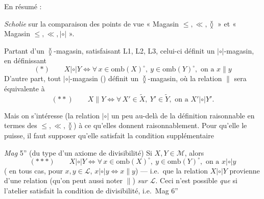 \documentclass[11pt,a4paper]{article}
\begin{document}
En résumé :

\emph{Scholie} sur la comparaison des points de vue « Magasin $\leq, \ll, \between$ » et « Magasin $\leq, \ll, \mathrel{|{\circ}|}$ ».

Partant d'un $\between$-magasin, satisfaisant L1, L2, L3, celui-ci définit un $\mathrel{|{\circ}|}$-magasin, en définissant
\[
  (*) \qquad X \mathrel{|{\circ}|} Y \Longleftrightarrow \forall\, x \in \mathrm{omb}(X)^{\circ},\ y \in \mathrm{omb}(Y)^{\circ}, \text{ on a } x \parallel y
\]
D'autre part, tout $\mathrel{|{\circ}|}$-magasin () définit un $\between$-magasin, où  la relation $\parallel$ sera équivalente à
\[
  (**) \qquad X \parallel Y \Longleftrightarrow \forall\, X' \in \widetilde{X},\ Y' \in \widetilde{Y}, \text{ on a } X' \mathrel{|{\circ}|} Y' .
\]

Mais on s'intéresse (la relation $\mathrel{|{\circ}|}$ un peu au-delà de la définition raisonnable en termes des  $\leq, \ll, \between$) à ce qu'elles donnent raisonnablement. Pour qu'elle le puisse, il faut supposer qu'elle satisfait la condition supplémentaire

\emph{Mag} 5'' (du type d'un axiome de divisibilité) Si $X, Y \in \mathcal{M}$, alors
\[
  (***) \qquad X \mathrel{|{\circ}|} Y \Longleftrightarrow \forall\, x \in \mathrm{omb}(X)^{\circ},\ y \in \mathrm{omb}(Y)^{\circ}, \text{ on a } x \mathrel{|{\circ}|} y
\]
(\struck{\ill{}} en tous cas, pour $x, y \in \mathcal{L}$, $x \mathrel{|{\circ}|} y \Leftrightarrow x \parallel y$) --- i.e.\ que la relation $X \mathrel{|{\circ}|} Y$ provienne d'une relation (qu'on peut aussi noter $\parallel$) \emph{sur $\mathcal{L}$}. Ceci n'est possible \emph{que} si l'atelier satisfait la condition de divisibilité, i.e.\ Mag 6'' \ill{}
\end{document}
